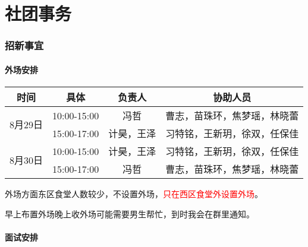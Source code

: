 
\part{社团事务}
\section{招新事宜}
\subsection{外场安排}
\begin{table}[!h]
\begin{tabular}{|c|c|c|c|}
\hline
时间                     & 具体          & 负责人   & 协助人员           \\ \hline
\multirow{2}{*}{8月29日} & 10:00-15:00 & 冯哲    & 曹志，苗珠环，焦梦瑶，林晓蕾 \\ \cline{2-4}
                       & 15:00-17:00 & 计昊，王泽 & 习特铭，王新玥，徐双，任保佳 \\ \hline
\multirow{2}{*}{8月30日} & 10:00-15:00 & 计昊，王泽 & 习特铭，王新玥，徐双，任保佳 \\ \cline{2-4}
                       & 15:00-17:00 & 冯哲    & 曹志，苗珠环，焦梦瑶，林晓蕾 \\ \hline
\end{tabular}
\end{table}
外场方面东区食堂人数较少，不设置外场，\textcolor{red}{只在西区食堂外设置外场}。

早上布置外场晚上收外场可能需要男生帮忙，到时我会在群里通知。


\subsection{面试安排}

